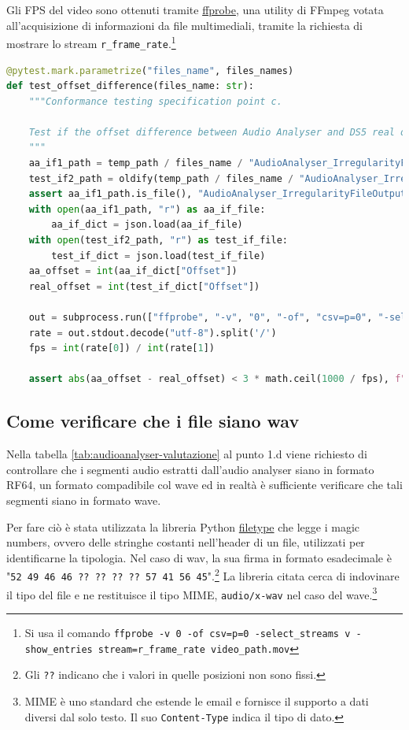 Gli FPS del video sono ottenuti tramite \href{https://ffmpeg.org/ffprobe.html}{ffprobe}, una utility di FFmpeg votata all'acquisizione di informazioni da file multimediali, tramite la richiesta di mostrare lo stream \verb|r_frame_rate|.\footnote{Si usa il comando \verb|ffprobe -v 0 -of csv=p=0 -select_streams v -show_entries stream=r_frame_rate video_path.mov|}
\begin{lstlisting}[language=Python]
@pytest.mark.parametrize("files_name", files_names)
def test_offset_difference(files_name: str):
    """Conformance testing specification point c.

    Test if the offset difference between Audio Analyser and DS5 real offset is small.
    """
    aa_if1_path = temp_path / files_name / "AudioAnalyser_IrregularityFileOutput1.json"
    test_if2_path = oldify(temp_path / files_name / "AudioAnalyser_IrregularityFileOutput1.json")
    assert aa_if1_path.is_file(), "AudioAnalyser_IrregularityFileOutput1.json not found"
    with open(aa_if1_path, "r") as aa_if_file:
        aa_if_dict = json.load(aa_if_file)
    with open(test_if2_path, "r") as test_if_file:
        test_if_dict = json.load(test_if_file)
    aa_offset = int(aa_if_dict["Offset"])
    real_offset = int(test_if_dict["Offset"])

    out = subprocess.run(["ffprobe", "-v", "0", "-of", "csv=p=0", "-select_streams", "v", "-show_entries", "stream=r_frame_rate", str(working_path / "PreservationAudioVisualFile" / (files_name+".mov"))], capture_output=True)
    rate = out.stdout.decode("utf-8").split('/')
    fps = int(rate[0]) / int(rate[1])
    
    assert abs(aa_offset - real_offset) < 3 * math.ceil(1000 / fps), f"Offset difference is too big: {abs(aa_offset - real_offset)}ms"
\end{lstlisting}


\subsection{Come verificare che i file siano wav} \label{ssec:audioanalyser-wav}    %
Nella tabella \ref{tab:audioanalyser-valutazione} al punto 1.d viene richiesto di controllare che i segmenti audio estratti dall'audio analyser siano in formato RF64, un formato compadibile col wave ed in realtà è sufficiente verificare che tali segmenti siano in formato wave.

Per fare ciò è stata utilizzata la libreria Python \href{https://github.com/h2non/filetype.py}{filetype} che legge i magic numbers, ovvero delle stringhe costanti nell'header di un file, utilizzati per identificarne la tipologia.
Nel caso di wav, la sua firma in formato esadecimale è "\texttt{52 49 46 46 ?? ?? ?? ??
57 41 56 45}".\footnote{Gli \texttt{??} indicano che i valori in quelle posizioni non sono fissi.}
La libreria citata cerca di indovinare il tipo del file e ne restituisce il tipo \acs{MIME}, \texttt{audio/x-wav} nel caso del wave.\footnote{\acf{MIME} è uno standard che estende le email e fornisce il supporto a dati diversi dal solo testo. Il suo \texttt{Content-Type} indica il tipo di dato.}


